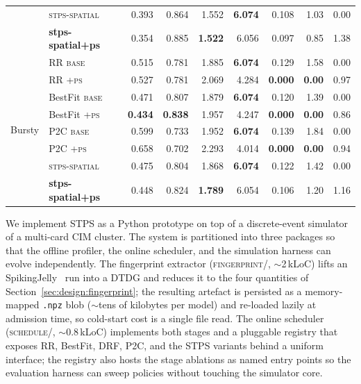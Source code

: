 \documentclass[letterpaper,twocolumn,10pt]{article}
\begin{document}
\begin{table}[!t]
\begin{tabular}{llrrrrrrr}
 & \textsc{stps-spatial}        & 0.393 & 0.864 & 1.552 & \textbf{6.074} & 0.108 & 1.03 & 0.00 \\
 & \textbf{stps-spatial+ps}     & 0.354 & 0.885 & \textbf{1.522} & 6.056 & 0.097 & 0.85 & 1.38 \\
\midrule
\multirow{8}{*}{Bursty}
 & RR \textsc{base}             & 0.515 & 0.781 & 1.885 & \textbf{6.074} & 0.129 & 1.58 & 0.00 \\
 & RR \textsc{+ps}              & 0.527 & 0.781 & 2.069 & 4.284 & \textbf{0.000} & \textbf{0.00} & 0.97 \\
 & BestFit \textsc{base}        & 0.471 & 0.807 & 1.879 & \textbf{6.074} & 0.120 & 1.39 & 0.00 \\
 & BestFit \textsc{+ps}         & \textbf{0.434} & \textbf{0.838} & 1.957 & 4.247 & \textbf{0.000} & \textbf{0.00} & 0.86 \\
 & P2C \textsc{base}            & 0.599 & 0.733 & 1.952 & \textbf{6.074} & 0.139 & 1.84 & 0.00 \\
 & P2C \textsc{+ps}             & 0.658 & 0.702 & 2.293 & 4.014 & \textbf{0.000} & \textbf{0.00} & 0.94 \\
 & \textsc{stps-spatial}        & 0.475 & 0.804 & 1.868 & \textbf{6.074} & 0.122 & 1.42 & 0.00 \\
 & \textbf{stps-spatial+ps}     & 0.448 & 0.824 & \textbf{1.789} & 6.054 & 0.106 & 1.20 & 1.16 \\
\bottomrule
\end{tabular}
\end{table}

We implement STPS as a Python prototype on top of a discrete-event simulator of a multi-card CIM cluster. The system is partitioned into three packages so that the offline profiler, the online scheduler, and the simulation harness can evolve independently. The fingerprint extractor (\textsc{fingerprint/}, $\sim$2\,kLoC) lifts an SpikingJelly~\cite{fang2023spikingjelly} run into a DTDG and reduces it to the four quantities of Section~\ref{sec:design:fingerprint}; the resulting artefact is persisted as a memory-mapped \texttt{.npz} blob ($\sim$tens of kilobytes per model) and re-loaded lazily at admission time, so cold-start cost is a single file read. The online scheduler (\textsc{schedule/}, $\sim$0.8\,kLoC) implements both stages and a pluggable registry that exposes RR, BestFit, DRF, P2C, and the STPS variants behind a uniform interface; the registry also hosts the stage ablations as named entry points so the evaluation harness can sweep policies without touching the simulator core.
\end{document}
